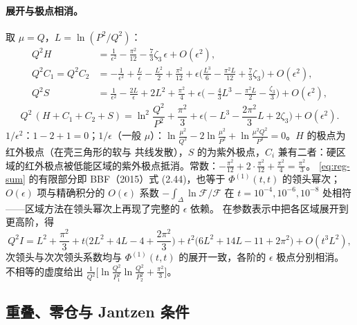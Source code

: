\paragraph{展开与极点相消。}取 $\mu=Q$，$L=\ln(P^2/Q^2)$：
\begin{align}
Q^2H&=\frac1{\epsilon^2}-\frac{\pi^2}{12}-\frac73\zeta_3\,\epsilon+O(\epsilon^2),\nonumber\\
Q^2C_1=Q^2C_2&=-\frac1{\epsilon^2}+\frac L\epsilon-\frac{L^2}2+\frac{\pi^2}{12}+\epsilon\Big(\frac{L^3}6-\frac{\pi^2L}{12}+\frac73\zeta_3\Big)+O(\epsilon^2),\nonumber\\
Q^2S&=\frac1{\epsilon^2}-\frac{2L}\epsilon+2L^2+\frac{\pi^2}4+\epsilon\Big(-\frac43L^3-\frac{\pi^2L}2-\frac{\zeta_3}3\Big)+O(\epsilon^2),\nonumber
\end{align}
\begin{equation}\label{eq:reg-sum}
Q^2\,(H+C_1+C_2+S)=\ln^2\frac{Q^2}{P^2}+\frac{\pi^2}3+\epsilon\Big(-L^3-\frac{2\pi^2}3L+2\zeta_3\Big)+O(\epsilon^2).
\end{equation}
$1/\epsilon^2$：$1-2+1=0$；$1/\epsilon$（一般 $\mu$）：$\ln\frac{\mu^2}{Q^2}-2\ln\frac{\mu^2}{P^2}+\ln\frac{\mu^2Q^2}{P^4}=0$。$H$ 的极点为红外极点（在壳三角形的软与
共线发散），$S$ 的为紫外极点，$C_i$ 兼有二者：硬区域的红外极点被低能区域的紫外极点抵消。常数：$-\frac{\pi^2}{12}+2\cdot\frac{\pi^2}{12}+\frac{\pi^2}4=\frac{\pi^2}3$。
\cref{eq:reg-sum} 的有限部分即 BBF（2015）式 (2.44)，也等于 $\Phi^{(1)}(t,t)$ 的领头幂次；$O(\epsilon)$ 项与精确积分的 $O(\epsilon)$ 系数
$-\int_\Delta\ln\mathcal F/\mathcal F$ 在 $t=10^{-4},10^{-6},10^{-8}$ 处相符——区域方法在领头幂次上再现了完整的 $\epsilon$ 依赖。
在参数表示中把各区域展开到更高阶，得
\begin{equation}\label{eq:reg-nlp}
Q^2I=L^2+\frac{\pi^2}3+t\Big(2L^2+4L-4+\frac{2\pi^2}3\Big)+t^2\big(6L^2+14L-11+2\pi^2\big)+O(t^3L^2),
\end{equation}
次领头与次次领头系数均与 $\Phi^{(1)}(t,t)$ 的展开一致，各阶的 $\epsilon$ 极点分别相消。
不相等的虚度给出 $\frac1{Q^2}\big[\ln\frac{Q^2}{P_1^2}\ln\frac{Q^2}{P_2^2}+\frac{\pi^2}3\big]$。

\subsection{重叠、零仓与 Jantzen 条件}\label{sec:regions-overlap}

